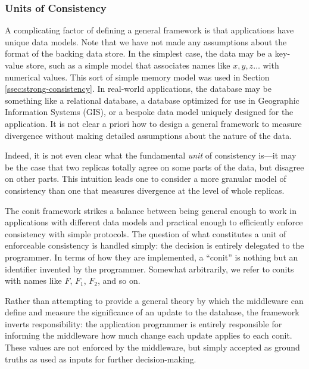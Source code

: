 \documentclass[]             %
{NASA}                       %
\theoremstyle{definition}
\begin{document}
\subsubsection{Units of Consistency}
\label{sssec:conit-units-consistency}
A complicating factor of defining a general framework is that
applications have unique data models. Note that we have not made any
assumptions about the format of the backing data store. In the
simplest case, the data may be a key-value store, such as a simple
model that associates names like $x, y, z\ldots$ with numerical
values. This sort of simple memory model was used in Section
\ref{ssec:strong-consistency}. In real-world applications, the
database may be something like a relational database, a database
optimized for use in Geographic Information Systems (GIS), or a
bespoke data model uniquely designed for the application. It is not
clear a priori how to design a general framework to measure divergence
without making detailed assumptions about the nature of the data.

Indeed, it is not even clear what the fundamental \emph{unit} of
consistency is---it may be the case that two replicas totally agree on
some parts of the data, but disagree on other parts. This intuition
leads one to consider a more granular model of consistency than one
that measures divergence at the level of whole replicas.

The conit framework strikes a balance between being general enough to
work in applications with different data models and practical enough
to efficiently enforce consistency with simple protocols. The question
of what constitutes a unit of enforceable consistency is handled
simply: the decision is entirely delegated to the programmer. In terms
of how they are implemented, a ``conit'' is nothing but an
identifier invented by the programmer. Somewhat arbitrarily, we refer
to conits with names like $F$, $F_1$, $F_2$, and so on.

Rather than attempting to provide a general theory by which the
middleware can define and measure the significance of an update to the
database, the framework inverts responsibility: the application
programmer is entirely responsible for informing the middleware how
much change each update applies to each conit. These values are not
enforced by the middleware, but simply accepted as ground truths as
used as inputs for further decision-making.
\end{document}
